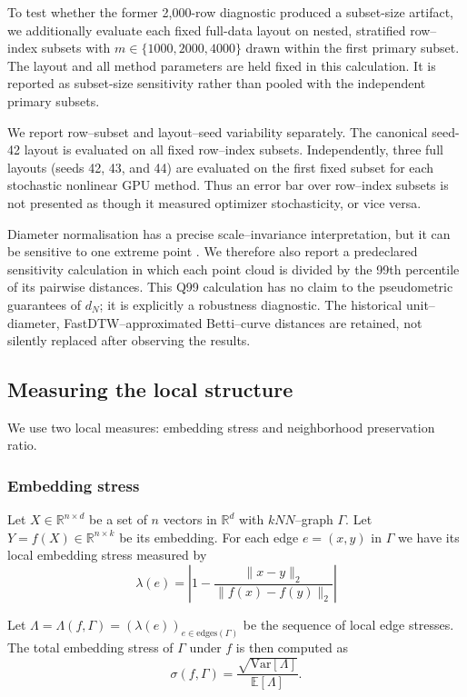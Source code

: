 \documentclass[11pt]{article}
\begin{document}
To test whether the former 2,000-row diagnostic produced a subset-size
artifact, we additionally evaluate each fixed full-data layout on nested,
stratified row--index subsets with $m\in\{1000,2000,4000\}$ drawn within the
first primary subset. The layout and all method parameters are held fixed in
this calculation. It is reported as subset-size sensitivity rather than pooled
with the \TopologySubsetCount{} independent primary subsets.

We report row--subset and layout--seed variability separately. The canonical
seed-42 layout is evaluated on all \TopologySubsetCount{} fixed row--index
subsets. Independently, three full layouts (seeds 42, 43, and 44) are evaluated
on the first fixed subset for each stochastic nonlinear GPU method. Thus an
error bar over row--index subsets is not presented as though it measured
optimizer stochasticity, or vice versa.

Diameter normalisation has a precise scale--invariance interpretation, but it
can be sensitive to one extreme point
\cite{may-normalized-bottleneck-2024}. We therefore also report a
predeclared sensitivity calculation in which each point cloud is divided by
the 99th percentile of its pairwise distances. This Q99 calculation has no
claim to the pseudometric guarantees of $d_N$; it is explicitly a robustness
diagnostic. The historical unit--diameter, FastDTW--approximated Betti--curve
distances are retained, not
silently replaced after observing the results.

\subsection{Measuring the local structure}

We use two local measures: embedding stress and neighborhood preservation ratio. 

\subsubsection{Embedding stress}

Let $X \in \mathbb{R}^{n\times d}$ be a set of $n$ vectors in $\mathbb{R}^d$ with $kNN$--graph $\Gamma$. Let $Y = f(X) \in \mathbb{R}^{n\times k}$ be its embedding. For each edge $e = (x,y)$ in $\Gamma$ we have its local embedding stress measured by 
\[
\lambda(e) = \left| 1 - \frac{\|x-y\|_2}{\|f(x) - f(y)\|_2}  \right|
\]

Let $\Lambda = \Lambda(f, \Gamma) = (\lambda(e))_{e \in \text{edges}(\Gamma)}$ be the sequence of local edge stresses.  The total embedding stress of $\Gamma$ under $f$ is then computed as 
\[
\sigma(f, \Gamma) = \frac{\sqrt{\mathrm{Var}[ \Lambda]}}{\mathbb{E}[\Lambda]}.
\]
\end{document}
